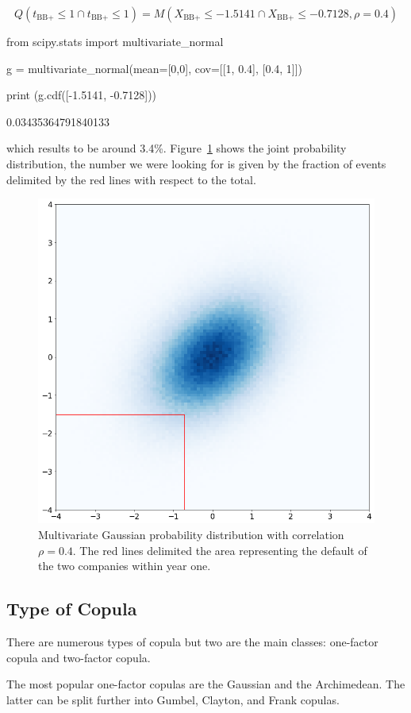 \begin{equation*}
Q(t_{\textrm{BB+}}\leq 1 \cap t_{\textrm{BB+}}\leq 1) = M(X_{\textrm{BB+}}\leq -1.5141 \cap X_{\textrm{BB+}}\leq -0.7128, \rho=0.4)
\end{equation*}

\begin{ipython}
from scipy.stats import multivariate_normal

g = multivariate_normal(mean=[0,0],
                        cov=[[1, 0.4],
                             [0.4, 1]])

print (g.cdf([-1.5141, -0.7128]))
\end{ipython}
\begin{ioutput}
0.03435364791840133
\end{ioutput}
\noindent
which results to be around 3.4\%. Figure~\ref{fig:copula_no_marginals} shows the joint probability distribution, the number we were looking for is given by the fraction of events delimited by the red lines with respect to the total.

\begin{figure}[htbp]
\centering
\includegraphics[width=0.5\linewidth]{figures/copula_no_marginals}
\caption{Multivariate Gaussian probability distribution with correlation $\rho=0.4$. The red lines delimited the area representing the default of the two companies within year one.}
\label{fig:copula_no_marginals}
\end{figure}

\subsection{Type of Copula}
There are numerous types of copula but two are the main classes: one-factor copula and two-factor copula.

The most popular one-factor copulas are the Gaussian and the Archimedean. The latter can be split further into Gumbel, Clayton, and Frank copulas.

